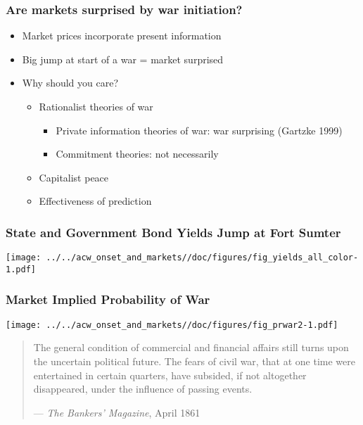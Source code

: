 \documentclass[]{beamer}\usepackage[]{graphicx}\usepackage[]{color}
\begin{document}
\begin{frame}
  \frametitle{Are markets surprised by war initiation?}

  \begin{itemize}
  \item Market prices incorporate present information
  \item Big jump at start of a war = market surprised
  \item Why should you care?
    \begin{itemize}
    \item Rationalist theories of war
      \begin{itemize}
      \item Private information theories of war: war surprising (Gartzke 1999)
      \item Commitment theories: not necessarily
      \end{itemize}
    \item Capitalist peace
    \item Effectiveness of prediction
    \end{itemize}
  \end{itemize}
\end{frame}

\begin{frame}
  \frametitle{State and Government Bond Yields Jump at Fort Sumter}

  \texttt{[image: ../../acw\_onset\_and\_markets//doc/figures/fig\_yields\_all\_color-1.pdf]}

\end{frame}

\begin{frame}
  \frametitle{Market Implied Probability of War}

  \texttt{[image: ../../acw\_onset\_and\_markets//doc/figures/fig\_prwar2-1.pdf]}

\end{frame}

\begin{frame}
  \begin{quote}
    The general condition of commercial and financial affairs still turns upon the uncertain political future. The fears of civil war, that at one time were entertained in certain quarters, have subsided, if not altogether disappeared, under the influence of passing events.

    --- \textit{The Bankers' Magazine}, April 1861
  \end{quote}

\end{frame}
\end{document}
